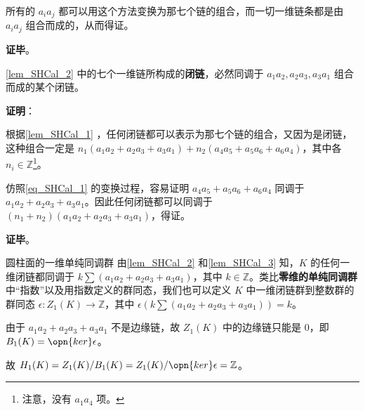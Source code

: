 所有的 $a_ia_j$ 都可以用这个方法变换为那七个链的组合，而一切一维链条都是由 $a_ia_j$ 组合而成的，从而得证。

\textbf{证毕}。

\begin{lemma}{}\label{lem_SHCal_3}
\autoref{lem_SHCal_2} 中的七个一维链所构成的\textbf{闭链}，必然同调于 $a_1a_2, a_2a_3, a_3a_1$ 组合而成的某个闭链。
\end{lemma}

\textbf{证明}：


根据\autoref{lem_SHCal_1} ，任何闭链都可以表示为那七个链的组合，又因为是闭链，这种组合一定是 $n_1(a_1a_2+a_2a_3+a_3a_1)+n_2(a_4a_5+a_5a_6+a_6a_4)$，其中各 $n_i\in\mathbb{Z}$\footnote{注意，没有 $a_1a_4$ 项。}。

仿照\autoref{eq_SHCal_1} 的变换过程，容易证明 $a_4a_5+a_5a_6+a_6a_4$ 同调于 $a_1a_2+a_2a_3+a_3a_1$。因此任何闭链都可以同调于 $(n_1+n_2)(a_1a_2+a_2a_3+a_3a_1)$，得证。


\textbf{证毕}。

\begin{corollary}{圆柱面的一维单纯同调群}
由\autoref{lem_SHCal_2} 和\autoref{lem_SHCal_3} 知，$K$ 的任何一维闭链都同调于 $k\sum (a_1a_2+a_2a_3+a_3a_1)$，其中 $k\in\mathbb{Z}$。类比\textbf{零维的单纯同调群}中“指数”以及用指数定义的群同态，我们也可以定义 $K$ 中一维闭链群到整数群的群同态 $\epsilon: Z_1(K)\to \mathbb{Z}$，其中 $\epsilon(k\sum (a_1a_2+a_2a_3+a_3a_1))=k$。

由于 $a_1a_2+a_2a_3+a_3a_1$ 不是边缘链，故 $Z_1(K)$ 中的边缘链只能是 $0$，即 $B_1(K)=\opn{ker}\epsilon$。

故 $H_1(K)=Z_1(K)/B_1(K)=Z_1(K)/\opn{ker}\epsilon=\mathbb{Z}$。
\end{corollary}



















